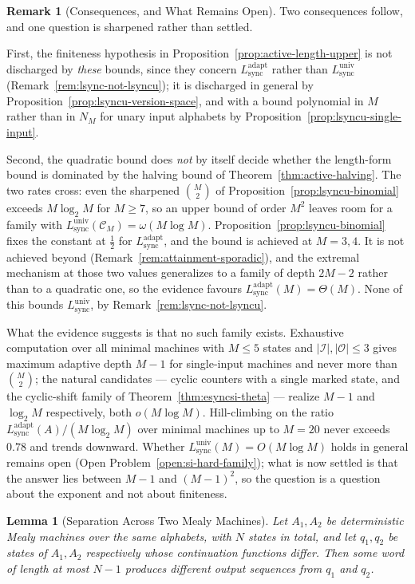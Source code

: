 \documentclass[12pt]{article}
\newtheorem{lemma}[theorem]{Lemma}
\theoremstyle{definition}
\newtheorem{remark}[theorem]{Remark}
\newcommand{\Lsync}{L_{\mathrm{sync}}^{\mathrm{adapt}}}
\newcommand{\Lsyncu}{L_{\mathrm{sync}}^{\mathrm{univ}}}
\begin{document}
\begin{remark}[Consequences, and What Remains Open]
\label{rem:lsyncu-consequences}
Two consequences follow, and one question is sharpened rather than settled.

First, the finiteness hypothesis in
Proposition~\ref{prop:active-length-upper} is not discharged by \emph{these}
bounds, since they concern $\Lsync$ rather than $\Lsyncu$
(Remark~\ref{rem:lsync-not-lsyncu}); it is discharged in general by
Proposition~\ref{prop:lsyncu-version-space}, and with a bound polynomial in
$M$ rather than in $N_M$ for unary input alphabets by
Proposition~\ref{prop:lsyncu-single-input}.

Second, the quadratic bound does \emph{not} by itself decide whether the
length-form bound is dominated by the halving bound of
Theorem~\ref{thm:active-halving}.  The two rates cross: even the sharpened
$\binom{M}{2}$ of Proposition~\ref{prop:lsyncu-binomial} exceeds $M\log_2M$ for
$M\ge7$, so an upper bound of order $M^2$ leaves room for a family with
$\Lsyncu(\mathcal C_M)=\omega(M\log M)$.  Proposition~\ref{prop:lsyncu-binomial} fixes the constant at $\tfrac12$ for
$\Lsync$, and the bound is achieved at $M=3,4$.  It is not achieved beyond
(Remark~\ref{rem:attainment-sporadic}), and the extremal mechanism at those two
values generalizes to a family of depth $2M-2$ rather than to a quadratic one,
so the evidence favours $\Lsync(M)=\Theta(M)$.  None of this bounds $\Lsyncu$,
by Remark~\ref{rem:lsync-not-lsyncu}.

What the evidence suggests is that no such family exists.  Exhaustive
computation over all minimal machines with $M\le5$ states and
$|\mathcal I|,|\mathcal O|\le3$ gives maximum adaptive depth
$M-1$ for single-input machines and never more than $\binom{M}{2}$; the natural
candidates --- cyclic counters with a single marked state, and the cyclic-shift
family of Theorem~\ref{thm:esyncsi-theta} --- realize $M-1$ and $\log_2M$
respectively, both $o(M\log M)$.  Hill-climbing on the ratio
$\Lsync(A)/(M\log_2M)$ over minimal machines up to $M=20$ never exceeds
$0.78$ and trends downward.  Whether $\Lsyncu(M)=O(M\log M)$ holds in general
remains open (Open Problem~\ref{open:si-hard-family}); what is now settled is
that the answer lies between $M-1$ and $(M-1)^2$, so the question is a
question about the exponent and not about finiteness.
\end{remark}

\begin{lemma}[Separation Across Two Mealy Machines]
\label{lem:moore-separation}
Let $A_1,A_2$ be deterministic Mealy machines over the same alphabets, with
$N$ states in total, and let $q_1,q_2$ be states of $A_1,A_2$ respectively
whose continuation functions differ.  Then some word of length at most $N-1$
produces different output sequences from $q_1$ and $q_2$.
\end{lemma}
\end{document}
